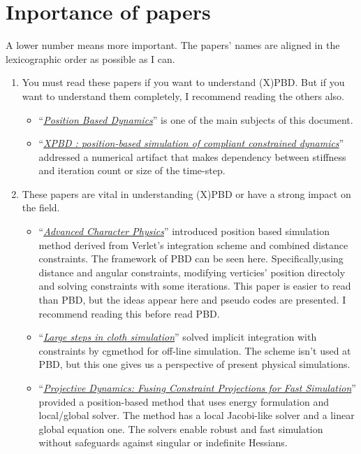 \documentclass[pdflatex,sn-mathphys-num]{sn-jnl}%
\theoremstyle{thmstyleone}%
\theoremstyle{thmstyletwo}%
\theoremstyle{thmstylethree}%
\newcommand{\pname}[1]{``{\uline{\sl {#1}}}''}
\begin{document}
\section{Inportance of papers}
A lower number means more important. The papers' names are aligned in the lexicographic order as possible as I can.
\begin{enumerate}
	\item You must read these papers if you want to understand (X)PBD. But if you want to understand them completely, I recommend reading the others also.
		\begin{itemize}
			\item \pname{Position Based Dynamics}\cite{PBD} is one of the main subjects of this document.
			\newline
			\item \pname{XPBD : position-based simulation of compliant constrained dynamics}\cite{XPBD} addressed a numerical artifact that makes dependency between stiffness and \gls{iteration} count or size of the time-step.
		\end{itemize}
		\item  These papers are vital in understanding (X)PBD or have a strong impact on the field.
		\begin{itemize}
			\item\pname{Advanced Character Physics}\cite{Jakobsen2003AdvancedCP} introduced position based simulation method derived from Verlet's integration scheme and combined distance constraints. The framework of PBD can be seen here. Specifically,using distance and angular constraints, modifying verticies' position directoly and solving \gls{constraint}s with some iterations. This paper is easier to read than PBD, but the ideas appear here and pseudo codes are presented. I recommend reading this before read PBD.
			\newline
			\item \pname{Large steps in cloth simulation}\cite{LargeStepBaraff} solved implicit integration with \gls{constraint}s by \gls{cgmethod} for off-line simulation. The scheme isn't used at PBD, but this one gives us a perspective of present physical simulations.
			\newline
			\item \pname{Projective Dynamics: Fusing Constraint Projections for Fast Simulation}\cite{ProjDyn} provided a position-based method that uses energy formulation and local/global solver. The method has a local Jacobi-like solver and a linear global equation one. The solvers enable robust and fast simulation without safeguards against singular or indefinite Hessians.

\end{itemize}
\end{enumerate}
\end{document}
